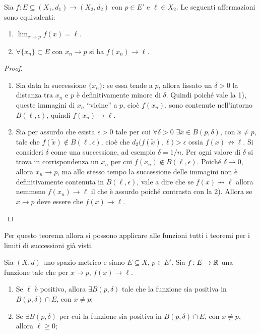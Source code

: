 \begin{teorema}
Sia $f\colon E\subseteq(X_1,d_1)\to(X_2,d_2)$ con $p\in E'$ e $\ell\in X_2$. Le seguenti affermazioni sono equivalenti:
\begin{enumerate}
\item$\lim_{x\to p}f(x)=\ell$.
\item$\forall\{x_n\}\subset E$ con $x_n\to p$ si ha $f(x_n)\to\ell$.
\end{enumerate}
\end{teorema}
\begin{proof}
\begin{enumerate}
\item Sia data la successione $\{x_n\}$: se essa tende a $p$, allora fissato un $\delta>0$ la distanza tra $x_n$ e $p$ è definitivamente minore di $\delta$. Quindi poiché vale la 1), queste immagini di $x_n$ ``vicine'' a $p$, cioè $f(x_n)$, sono contenute nell'intorno $B(\ell,\epsilon)$, quindi $f(x_n)\to\ell$.
\item Sia per assurdo che esista $\epsilon>0$ tale per cui $\forall\delta>0$ $\exists \tilde{x}\in B(p,\delta)$, con $\tilde{x}\neq p$, tale che $f(\tilde{x})\notin B(\ell,\epsilon)$, cioè che $d_2\big(f(\tilde{x}),\ell\big)>\epsilon$ ossia $f(x)\not\to\ell$.
Si consideri $\delta$ come una successione, ad esempio $\delta=1/n$. Per ogni valore di $\delta$ si trova in corrispondenza un $x_n$ per cui $f(x_n)\notin B(\ell,\epsilon)$. Poiché $\delta\to0$, allora $x_n\to p$, ma allo stesso tempo la successione delle immagini non è definitivamente contenuta in $B(\ell,\epsilon)$, vale a dire che se $f(x)\not\to\ell$ allora nemmeno $f(x_n)\to\ell$ il che è assurdo poiché contrasta con la 2). Allora se $x\to p$ deve essere che $f(x)\to\ell$.\qedhere
\end{enumerate}
\end{proof}
Per questo teorema allora si possono applicare alle funzioni tutti i teoremi per i limiti di successioni già visti.
\begin{teorema}
\label{t:permanenza_segno-f}
Sia $(X,d)$ uno spazio metrico e siano $E\subseteq X$, $p\in E'$. Sia $f\colon E\to\mathbb{R}$ una funzione tale che per $x\to p$, $f(x)\to\ell$.
\begin{enumerate}
\item Se $\ell$ è positivo, allora $\exists B(p,\delta)$ tale che la funzione sia positiva in $B(p,\delta)\cap E$, con $x\neq p$;
\item Se $\exists B(p,\delta)$ per cui la funzione sia positiva in $B(p,\delta)\cap E$, con $x\neq p$, allora $\ell\geq 0$;
\end{enumerate}
\end{teorema}
